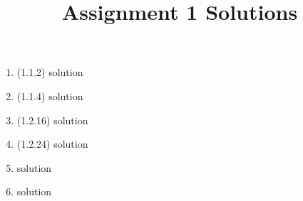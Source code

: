 \documentclass[12pt, letterpaper]{../homework}
\title{Assignment 1 Solutions}
\newcommand{\booksolution}[2]{
  \item (#1.#2) {solution}
}
\newcommand{\extrahwsolution}[2]{
  \item {solution}
}
\begin{document}
  \maketitle
  
  \begin{enumerate}
    \booksolution{1.1}{2}
    \booksolution{1.1}{4}
    \booksolution{1.2}{16}
    \booksolution{1.2}{24}
    \extrahwsolution{1.1}{poll}
    \extrahwsolution{1.1}{potato}
  \end{enumerate}
\end{document}

